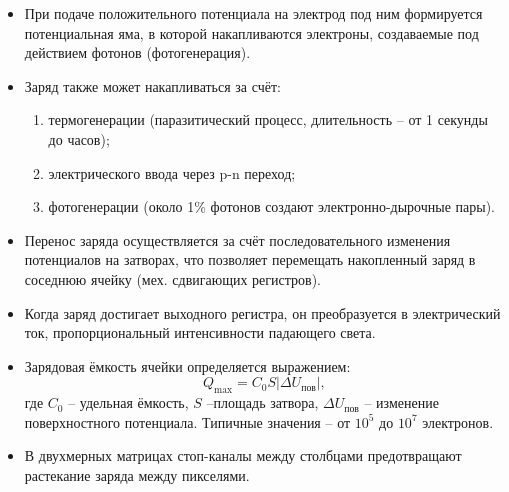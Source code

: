 	\begin{itemize}[leftmargin=1.5em]
		\item При подаче положительного потенциала на электрод под ним формируется потенциальная яма, 
		\newline
		в которой накапливаются электроны, создаваемые под действием фотонов (фотогенерация).
		\item Заряд также может накапливаться за счёт:
		\begin{enumerate}
			\item термогенерации (паразитический процесс, длительность -- от 1 секунды до часов);
			\item электрического ввода через p-n переход;
			\item фотогенерации (около 1\% фотонов создают электронно-дырочные пары).
		\end{enumerate}
		\item Перенос заряда осуществляется за счёт последовательного изменения потенциалов на затворах, что позволяет перемещать накопленный заряд в соседнюю ячейку (мех. сдвигающих регистров).
		\item Когда заряд достигает выходного регистра, он преобразуется в электрический ток, пропорциональный интенсивности падающего света.
		\item Зарядовая ёмкость ячейки определяется выражением:
		\[
		Q_{\text{max}} = C_0 S |\Delta U_{\text{пов}}|,
		\]
		где \( C_0 \) -- удельная ёмкость, \( S \) --площадь затвора, \( \Delta U_{\text{пов}} \) -- изменение поверхностного потенциала. Типичные значения -- от \( 10^5 \) до \( 10^7 \) электронов.
		\item В двухмерных матрицах стоп-каналы между столбцами предотвращают растекание заряда между пикселями.
	\end{itemize}
	
